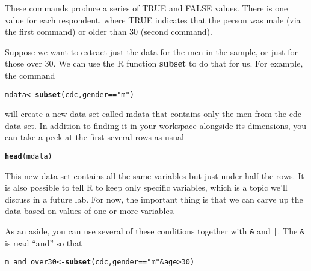 \documentclass{article}\usepackage[]{graphicx}\usepackage[]{color}
\makeatletter
\newcommand{\hlnum}[1]{\textcolor[rgb]{0.686,0.059,0.569}{#1}}%
\newcommand{\hlstr}[1]{\textcolor[rgb]{0.192,0.494,0.8}{#1}}%
\newcommand{\hlopt}[1]{\textcolor[rgb]{0,0,0}{#1}}%
\newcommand{\hlstd}[1]{\textcolor[rgb]{0.345,0.345,0.345}{#1}}%
\newcommand{\hlkwb}[1]{\textcolor[rgb]{0.69,0.353,0.396}{#1}}%
\newcommand{\hlkwd}[1]{\textcolor[rgb]{0.737,0.353,0.396}{\textbf{#1}}}%
\newenvironment{kframe}{%
 \def\at@end@of@kframe{}%
 \ifinner\ifhmode%
  \def\at@end@of@kframe{\end{minipage}}%
  \begin{minipage}{\columnwidth}%
 \fi\fi%
 \def\FrameCommand##1{\hskip\@totalleftmargin \hskip-\fboxsep
 \colorbox{shadecolor}{##1}\hskip-\fboxsep
     \hskip-\linewidth \hskip-\@totalleftmargin \hskip\columnwidth}%
 \MakeFramed {\advance\hsize-\width
   \@totalleftmargin\z@ \linewidth\hsize
   \@setminipage}}%
 {\par\unskip\endMakeFramed%
 \at@end@of@kframe}
\newenvironment{knitrout}{}{} %
\makeatother
\begin{document}
These commands produce a series of \hlnum{TRUE} and \hlnum{FALSE}  values. There is one value for each respondent, where \hlnum{TRUE} indicates that the person was male (via the first command) or older than 30 (second command).

Suppose we want to extract just the data for the men in the sample, or just for those over 30. We can use the R function \hlkwd{subset} to do that for us. For example, the command

\begin{knitrout}
\color{fgcolor}\begin{kframe}
\begin{alltt}
\hlstd{mdata} \hlkwb{<-} \hlkwd{subset}\hlstd{(cdc, gender} \hlopt{==} \hlstr{"m"}\hlstd{)}
\end{alltt}
\end{kframe}
\end{knitrout}

will create a new data set called \hlstd{mdata} that contains only the men from the \hlstd{cdc} data set. In addition to finding it in your workspace alongside its dimensions, you can take a peek at the first several rows as usual

\begin{knitrout}
\color{fgcolor}\begin{kframe}
\begin{alltt}
\hlkwd{head}\hlstd{(mdata)}
\end{alltt}
\end{kframe}
\end{knitrout}

This new data set contains all the same variables but just under half the rows. It is also possible to tell R to keep only specific variables, which is a topic we'll discuss in a future lab. For now, the important thing is that we can carve up the data based on values of one or more variables.

As an aside, you can use several of these conditions together with \texttt{\&} and \texttt{|}. The \texttt{\&} is read ``and'' so that

\begin{knitrout}
\color{fgcolor}\begin{kframe}
\begin{alltt}
\hlstd{m_and_over30} \hlkwb{<-} \hlkwd{subset}\hlstd{(cdc, gender} \hlopt{==} \hlstr{"m"} \hlopt{&} \hlstd{age} \hlopt{>} \hlnum{30}\hlstd{)}
\end{alltt}
\end{kframe}
\end{knitrout}
\end{document}

